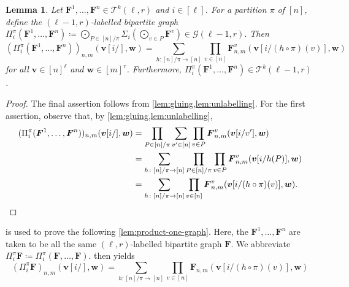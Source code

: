 \documentclass[10pt,a4paper]{article}
\theoremstyle{definition}
\theoremstyle{plain}
\newtheorem{lemma}[definition]{Lemma}
\theoremstyle{remark}
\begin{document}
	\begin{lemma}\label{lem:pi-i-pi}
		Let $\boldsymbol{F}^1, \dots, \boldsymbol{F}^n \in \mathcal{T}^k(\ell, r)$ and $i \in [\ell]$.
		For a partition $\pi$ of $[n]$,
		define the $(\ell-1, r)$-labelled bipartite graph
		\(
			\Pi_i^\pi(\boldsymbol{F}^1, \dots, \boldsymbol{F}^n) \coloneqq \bigodot_{P \in [n]/\pi} \Sigma_i(\bigodot_{v \in P} \boldsymbol{F}^v) \in \mathcal{G}(\ell-1, r).
		\)
		Then
		\[
			(\Pi_i^\pi(\boldsymbol{F}^1, \dots, \boldsymbol{F}^n))_{n,m}(\boldsymbol{v}[i/], \boldsymbol{w}) = \sum_{h \colon [n]/\pi \to [n]}  \prod_{v \in [n]} \boldsymbol{F}^v_{n, m}(\boldsymbol{v}[i/(h\circ \pi)(v)], \boldsymbol{w})
		\]
		for all $\boldsymbol{v} \in [n]^\ell$ and $\boldsymbol{w} \in [m]^r$.
		Furthermore, $\Pi_i^\pi(\boldsymbol{F}^1, \dots, \boldsymbol{F}^n) \in \mathcal{T}^k(\ell-1, r) $. 
	\end{lemma}
	\begin{proof}
		The final assertion follows from \cref{lem:gluing,lem:unlabelling}.
		For the first assertion, observe that, by \cref{lem:gluing,lem:unlabelling},
		\begin{align*}
			(\Pi_i^\pi(\boldsymbol{F}^1, \dots, \boldsymbol{F}^n))_{n,m}(\boldsymbol{v}[i/], \boldsymbol{w})
			&= \prod_{P \in [n]/\pi} \sum_{v' \in [n]} \prod_{v \in P} \boldsymbol{F}^v_{n,m}(\boldsymbol{v}[i/v'], \boldsymbol{w}) \\
			&= \sum_{h \colon [n]/\pi \to [n]}  \prod_{P \in [n]/\pi} \prod_{v \in P} \boldsymbol{F}^v_{n,m}(\boldsymbol{v}[i/h(P)], \boldsymbol{w}) \\
			&= \sum_{h \colon [n]/\pi \to [n]}  \prod_{v \in [n]} \boldsymbol{F}_{n, m}^v(\boldsymbol{v}[i/(h\circ \pi)(v)], \boldsymbol{w}). \qedhere
		\end{align*}
	\end{proof}
	
	 is used to prove the following \cref{lem:product-one-graph}.
	Here,  the $\boldsymbol{F}^1, \dots, \boldsymbol{F}^n$ are taken to be all the same $(\ell, r)$-labelled bipartite graph $\boldsymbol{F}$.
	We abbreviate $\Pi_i^\pi \boldsymbol{F} \coloneqq \Pi_i^\pi(\boldsymbol{F}, \dots, \boldsymbol{F})$.
	 then yields
	\begin{equation}\label{eq:pi-i-pi-simplified}
		(\Pi_i^\pi \boldsymbol{F})_{n,m}(\boldsymbol{v}[i/], \boldsymbol{w}) = \sum_{h \colon [n]/\pi \to [n]}  \prod_{v \in [n]} \boldsymbol{F}_{n, m}(\boldsymbol{v}[i/(h\circ \pi)(v)], \boldsymbol{w})
	\end{equation}
	
\end{document}

